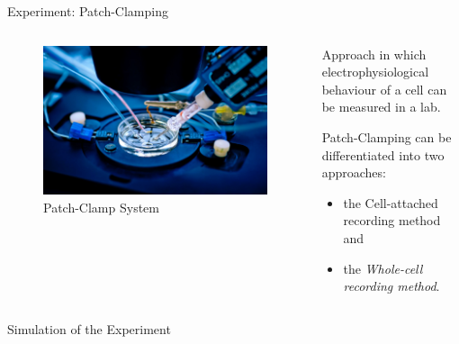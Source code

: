 \documentclass[aspectratio=169, hyperref={colorlinks=true}]{beamer}
\begin{document}
  \begin{frame}{Experiment: Patch-Clamping}
    \begin{columns}
      \begin{column}{0.4\textwidth}
        \begin{figure}
          \includegraphics[width=\textwidth]{../../figures/patch-clamp-system.jpeg}
          \caption{Patch-Clamp System \cite{2025-patch-clamp-image}}
        \end{figure}
      \end{column}
      \begin{column}{0.58\textwidth}
        Approach in which electrophysiological behaviour of a cell can be measured in a lab.

        Patch-Clamping can be differentiated into two approaches:
        \begin{itemize}
          \item the Cell-attached recording method and
          \item the \emph{Whole-cell recording method}.
        \end{itemize}
      \end{column}
    \end{columns}
  \end{frame}

  \begin{frame}{Simulation of the Experiment}
  \end{frame}
\end{document}
